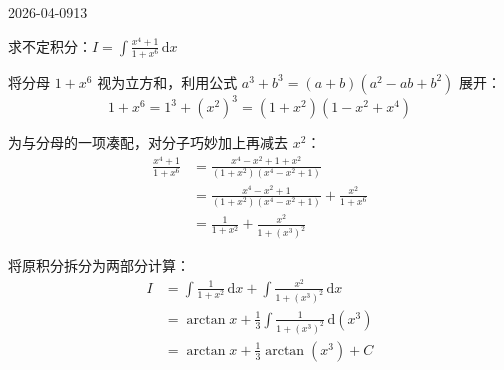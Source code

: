 \begin{mistake}{2026-04-09}{13}

\begin{problemcontent}
求不定积分：\(\displaystyle I = \int \frac{x^4 + 1}{1 + x^6} \, \mathrm{d}x \)
\end{problemcontent}

\begin{solutioncontent}
将分母 \(1+x^6\) 视为立方和，利用公式 \(a^3+b^3=(a+b)(a^2-ab+b^2)\) 展开：
\[ 1+x^6 = 1^3 + (x^2)^3 = (1+x^2)(1-x^2+x^4) \]

为与分母的一项凑配，对分子巧妙加上再减去 \(x^2\)：
\[
\begin{aligned}
\frac{x^4 + 1}{1 + x^6} 
&= \frac{x^4 - x^2 + 1 + x^2}{(1+x^2)(x^4-x^2+1)} \\
&= \frac{x^4-x^2+1}{(1+x^2)(x^4-x^2+1)} + \frac{x^2}{1+x^6} \\
&= \frac{1}{1+x^2} + \frac{x^2}{1+(x^3)^2}
\end{aligned}
\]

将原积分拆分为两部分计算：
\[
\begin{aligned}
I &= \int \frac{1}{1+x^2} \, \mathrm{d}x + \int \frac{x^2}{1+(x^3)^2} \, \mathrm{d}x \\
&= \arctan x + \frac{1}{3} \int \frac{1}{1+(x^3)^2} \, \mathrm{d}(x^3) \\
&= \arctan x + \frac{1}{3} \arctan(x^3) + C
\end{aligned}
\]
\end{solutioncontent}


\end{mistake}
